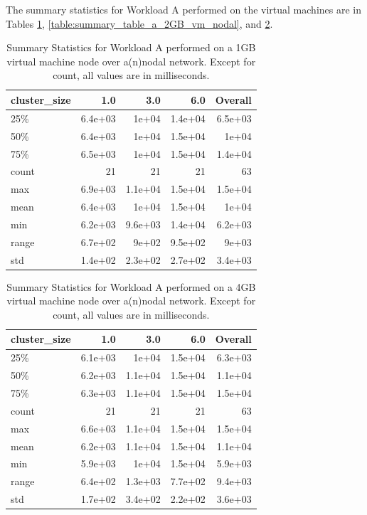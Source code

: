 The summary statistics for Workload A performed on the virtual machines are in Tables \ref{table:summary_table_a_1GB_vm_nodal}, \ref{table:summary_table_a_2GB_vm_nodal}, and \ref{table:summary_table_a_4GB_vm_nodal}.
\begin{table}
\begin{tabular}{lrrrr}
\toprule
cluster\_size &     1.0 &     3.0 &     6.0 &  Overall \\
\midrule
25\%   & 6.4e+03 &   1e+04 & 1.4e+04 &  6.5e+03 \\
50\%   & 6.4e+03 &   1e+04 & 1.5e+04 &    1e+04 \\
75\%   & 6.5e+03 &   1e+04 & 1.5e+04 &  1.4e+04 \\
count &      21 &      21 &      21 &       63 \\
max   & 6.9e+03 & 1.1e+04 & 1.5e+04 &  1.5e+04 \\
mean  & 6.4e+03 &   1e+04 & 1.5e+04 &    1e+04 \\
min   & 6.2e+03 & 9.6e+03 & 1.4e+04 &  6.2e+03 \\
range & 6.7e+02 &   9e+02 & 9.5e+02 &    9e+03 \\
std   & 1.4e+02 & 2.3e+02 & 2.7e+02 &  3.4e+03 \\
\bottomrule
\end{tabular}
\caption{Summary Statistics for Workload A performed on a 1GB virtual machine node over a(n)nodal network.  Except for count, all values are in milliseconds.}
\label{table:summary_table_a_1GB_vm_nodal}
\end{table}

\begin{table}
\begin{tabular}{lrrrr}
\toprule
cluster\_size &     1.0 &     3.0 &     6.0 &  Overall \\
\midrule
25\%   & 6.1e+03 &   1e+04 & 1.5e+04 &  6.3e+03 \\
50\%   & 6.2e+03 & 1.1e+04 & 1.5e+04 &  1.1e+04 \\
75\%   & 6.3e+03 & 1.1e+04 & 1.5e+04 &  1.5e+04 \\
count &      21 &      21 &      21 &       63 \\
max   & 6.6e+03 & 1.1e+04 & 1.5e+04 &  1.5e+04 \\
mean  & 6.2e+03 & 1.1e+04 & 1.5e+04 &  1.1e+04 \\
min   & 5.9e+03 &   1e+04 & 1.5e+04 &  5.9e+03 \\
range & 6.4e+02 & 1.3e+03 & 7.7e+02 &  9.4e+03 \\
std   & 1.7e+02 & 3.4e+02 & 2.2e+02 &  3.6e+03 \\
\bottomrule
\end{tabular}
\caption{Summary Statistics for Workload A performed on a 4GB virtual machine node over a(n)nodal network.  Except for count, all values are in milliseconds.}
\label{table:summary_table_a_4GB_vm_nodal}
\end{table}




